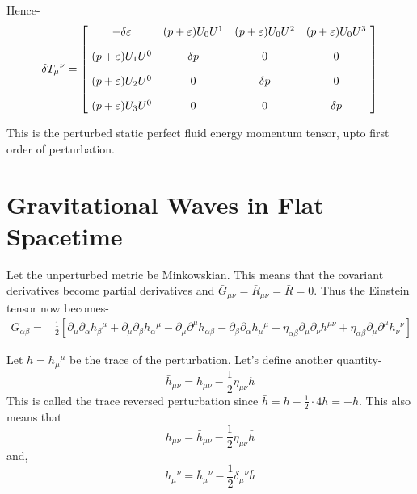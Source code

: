 \documentclass[12pt, letterpaper]{report}
\begin{document}
Hence- 
\begin{equation}
\delta T_\mu{}^\nu= \begin{bmatrix}
    \ -\delta\varepsilon & \qty(p+\varepsilon)U_0 U^1 & \qty(p+\varepsilon)U_0 U^2 & \qty(p+\varepsilon)U_0 U^3 \ \\[10pt]
    \ \qty(p+\varepsilon)U_1 U^0 & \delta p & 0 & 0 \ \\[10pt]
    \ \qty(p+\varepsilon)U_2 U^0 & 0 & \delta p & 0 \ \\[10pt]
    \ \qty(p+\varepsilon)U_3 U^0 & 0 & 0 & \delta p\ 
\end{bmatrix}\label{pert T}
\end{equation}

This is the perturbed static perfect fluid energy momentum tensor, upto first order of perturbation.

\section{Gravitational Waves in Flat Spacetime}

Let the unperturbed metric be Minkowskian. This means that the covariant derivatives become partial derivatives and $\bar{G}_{\mu\nu}= \bar{R}_{\mu\nu}= \bar{R}= 0$. Thus the Einstein tensor now becomes- 
\begin{align*}
    G_{\alpha\beta}= &\frac{1}{2}\left[\partial_\mu \partial_\alpha h_{\beta}{}^\mu+ \partial_\mu \partial_{\beta}h_{\alpha}{}^\mu- \partial_\mu \partial^{\mu}h_{\alpha\beta}-\partial_\beta \partial_\alpha h_{\mu}{}^\mu- \eta_{\alpha\beta}\partial_\mu \partial_\nu h^{\mu\nu}+ \eta_{\alpha\beta}\partial_\mu \partial^{\mu}h_{\nu}{}^\nu\right]
\end{align*}

Let $h= h_\mu{}^\mu$ be the trace of the perturbation. Let's define another quantity- $$\bar{h}_{\mu\nu}= h_{\mu\nu}-\frac{1}{2}\eta_{\mu\nu}h$$
This is called the trace reversed perturbation since $\bar{h}= h-\frac{1}{2}\cdot 4 h= -h$. This also means that $${h}_{\mu\nu}= \bar{h}_{\mu\nu}-\frac{1}{2}\eta_{\mu\nu}\bar{h}$$
and, $${h}_\mu{}^\nu= \bar{h}_\mu{}^\nu-\frac{1}{2}\delta_\mu{}^\nu\bar{h}$$
 
\end{document}
